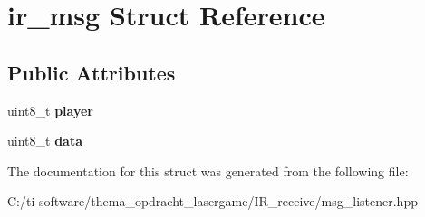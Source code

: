 \hypertarget{structir__msg}{}\section{ir\+\_\+msg Struct Reference}
\label{structir__msg}
\subsection*{Public Attributes}
\begin{DoxyCompactItemize}
\item 
\mbox{\label{structir__msg_a1aba19ec600f05dbf3e20cd94585f2b7}} 
uint8\+\_\+t {\bfseries player}
\item 
\mbox{\label{structir__msg_a186ea1a98c46be88a9664b2ca285566f}} 
uint8\+\_\+t {\bfseries data}
\end{DoxyCompactItemize}


The documentation for this struct was generated from the following file\+:\begin{DoxyCompactItemize}
\item 
C\+:/ti-\/software/thema\+\_\+opdracht\+\_\+lasergame/\+I\+R\+\_\+receive/msg\+\_\+listener.\+hpp\end{DoxyCompactItemize}
